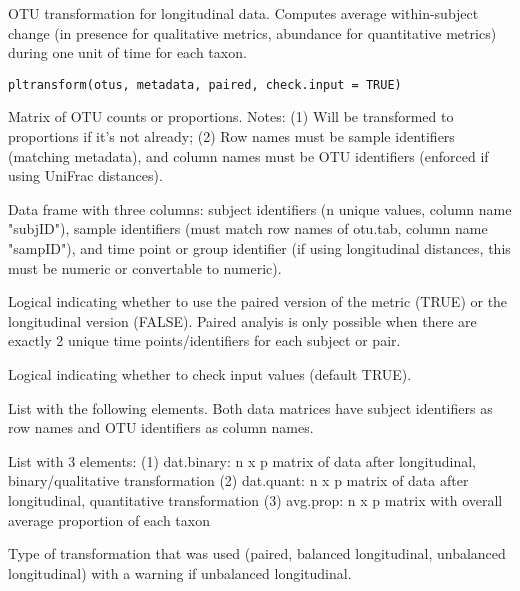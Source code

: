 \documentclass[a4paper]{book}
\begin{document}
%
\begin{Description}\relax
OTU transformation for longitudinal data. Computes average within-subject change 
(in presence for qualitative metrics, abundance for quantitative metrics) 
during one unit of time for each taxon.
\end{Description}
%
\begin{Usage}
\begin{verbatim}
pltransform(otus, metadata, paired, check.input = TRUE)
\end{verbatim}
\end{Usage}
%
\begin{Arguments}
\begin{ldescription}
\item[\code{otus}] Matrix of OTU counts or proportions. Notes: (1) Will be transformed to 
proportions if it's not already; (2) Row names must be sample identifiers 
(matching metadata), and column names must be OTU identifiers (enforced if 
using UniFrac distances).

\item[\code{metadata}] Data frame with three columns: subject identifiers (n unique values, column name "subjID"), 
sample identifiers (must match row names of otu.tab, column name "sampID"), 
and time point or group identifier (if using longitudinal distances, this must be numeric or 
convertable to numeric).

\item[\code{paired}] Logical indicating whether to use the paired version of the metric (TRUE) or the 
longitudinal version (FALSE). Paired analyis is only possible when there are exactly 2 
unique time points/identifiers for each subject or pair.

\item[\code{check.input}] Logical indicating whether to check input values (default TRUE).
\end{ldescription}
\end{Arguments}
%
\begin{Value}
List with the following elements. Both data matrices have subject identifiers 
as row names and OTU identifiers as column names.  
\begin{ldescription}
\item[\code{tsf.data}] List with 3 elements: 
(1) dat.binary: n x p matrix of data after longitudinal, binary/qualitative transformation 
(2) dat.quant: n x p matrix of data after longitudinal, quantitative transformation
(3) avg.prop: n x p matrix with overall average proportion of each taxon 
\item[\code{type}] Type of transformation that was used (paired, balanced longitudinal, 
unbalanced longitudinal) with a warning if unbalanced longitudinal.
\end{ldescription}
\end{Value}
\end{document}
